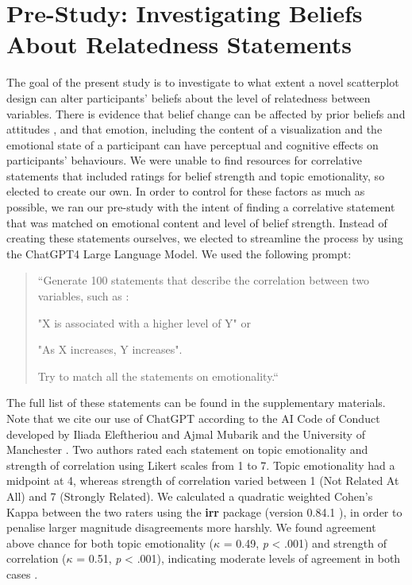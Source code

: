 \documentclass[manuscript,screen,review]{acmart}
\begin{document}
\section{Pre-Study: Investigating Beliefs About Relatedness
Statements}\label{sec-pre-study}

The goal of the present study is to investigate to what extent a novel
scatterplot design can alter participants' beliefs about the level of
relatedness between variables. There is evidence that belief change can
be affected by prior beliefs and attitudes
\citep{xiong_2022, markant_2023}, and that emotion, including the
content of a visualization \citep{phelps_2006, harrison_2013} and the
emotional state of a participant \citep{thoresen_2017} can have
perceptual and cognitive effects on participants' behaviours. We were
unable to find resources for correlative statements that included
ratings for belief strength and topic emotionality, so elected to create
our own. In order to control for these factors as much as possible, we
ran our pre-study with the intent of finding a correlative statement
that was matched on emotional content and level of belief strength.
Instead of creating these statements ourselves, we elected to streamline
the process by using the ChatGPT4 Large Language Model. We used the
following prompt:

\begin{quotation}

    ``Generate 100 statements that describe the correlation between two variables, such as :

     "X is associated with a higher level of Y" or

     "As X increases, Y increases".

    Try to match all the statements on emotionality.``
    
\end{quotation}

The full list of these statements can be found in the supplementary
materials. Note that we cite our use of ChatGPT according to the AI Code
of Conduct developed by Iliada Eleftheriou and Ajmal Mubarik and the
University of Manchester \citep{iliada_2023}. Two authors rated each
statement on topic emotionality and strength of correlation using Likert
scales from 1 to 7. Topic emotionality had a midpoint at 4, whereas
strength of correlation varied between 1 (Not Related At All) and 7
(Strongly Related). We calculated a quadratic weighted Cohen's Kappa
between the two raters using the \textbf{irr} package (version 0.84.1
\citep{irr}), in order to penalise larger magnitude disagreements more
harshly. We found agreement above chance for both topic emotionality
(\(\kappa\) = 0.49, \emph{p} \textless{} .001) and strength of
correlation (\(\kappa\) = 0.51, \emph{p} \textless{} .001), indicating
moderate levels of agreement in both cases
\citep{cohen_1968, fleiss_1969}.
\end{document}
